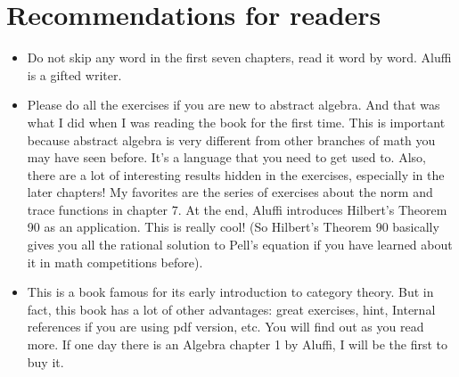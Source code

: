 \documentclass[15pt]{scrartcl}
\begin{document}
\section{Recommendations for readers}
\begin{itemize}
    \item Do not skip any word in the first seven chapters, read it word by word. Aluffi is a gifted writer. 
    \item Please do all the exercises if you are new to abstract algebra. And that was what I did when I was reading the book for the first time. This is important because abstract algebra is very different from other branches of math you may have seen before. It's a language that you need to get used to. Also, there are a lot of interesting results hidden in the exercises, especially in the later chapters! My favorites are the series of exercises about the norm and trace functions in chapter 7. At the end, Aluffi introduces Hilbert's Theorem 90 as an application. This is really cool! (So Hilbert's Theorem 90 basically gives you all the rational solution to Pell's equation if you have learned about it in math competitions before).
    \item This is a book famous for its early introduction to category theory. But in fact, this book has a lot of other advantages: great exercises, hint, Internal references if you are using pdf version, etc.  You will find out as you read more. If one day there is an Algebra chapter 1 by Aluffi, I will be the first to buy it.
\end{itemize}

\newpage 
\tableofcontents
\newpage
\end{document}
